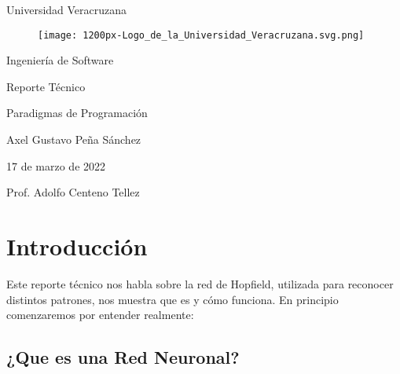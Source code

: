\documentclass[12pt]{article}
\begin{document}
\begin{titlepage}
   \begin{center}
        \vspace*{2 cm} %

        \Huge{Universidad Veracruzana} 
        \vspace{0.25 cm}
        
        \begin{figure}[h]
        \centering
        \texttt{[image: 1200px-Logo\_de\_la\_Universidad\_Veracruzana.svg.png]}
        \end{figure}
        
        \LARGE{Ingeniería de Software}
        \vspace{0.25 cm}
        \Large{}
        
        \Large{Reporte Técnico}
        \vspace{0.25 cm}
        \Large{}
       
        \vspace{0.25cm}
        \Large{Paradigmas de Programación}
       
        \vspace{0.25 cm}
        \Large{Axel Gustavo Peña Sánchez}
        
        \vspace{0.25 cm}
        \Large{17 de marzo de 2022}
       
       \vspace{0.25 cm}
       \Large{Prof. Adolfo Centeno Tellez}

       \vfill
    \end{center}
\end{titlepage}

\setcounter{page}{2}
\pagestyle{fancy}
\fancyhf{}
\rhead{\thepage}


\section*{\Huge{Introducción}} 

Este reporte técnico nos habla sobre la red de Hopfield, utilizada para reconocer distintos patrones, nos muestra que es y cómo funciona. En principio comenzaremos por entender realmente: 

\subsection*{\LARGE{¿Que es una Red Neuronal?}}
\end{document}
